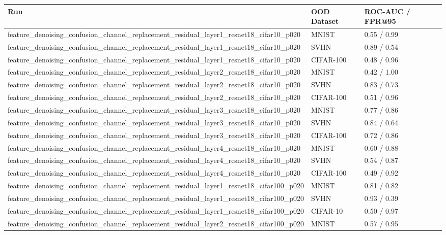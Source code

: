 \begin{tabular}{lll}
\toprule
Run & OOD Dataset & ROC-AUC / FPR@95 \\
\midrule
feature\_denoising\_confusion\_channel\_replacement\_residual\_layer1\_resnet18\_cifar10\_p020 & MNIST & 0.55 / 0.99 \\
feature\_denoising\_confusion\_channel\_replacement\_residual\_layer1\_resnet18\_cifar10\_p020 & SVHN & 0.89 / 0.54 \\
feature\_denoising\_confusion\_channel\_replacement\_residual\_layer1\_resnet18\_cifar10\_p020 & CIFAR-100 & 0.48 / 0.96 \\
feature\_denoising\_confusion\_channel\_replacement\_residual\_layer2\_resnet18\_cifar10\_p020 & MNIST & 0.42 / 1.00 \\
feature\_denoising\_confusion\_channel\_replacement\_residual\_layer2\_resnet18\_cifar10\_p020 & SVHN & 0.83 / 0.73 \\
feature\_denoising\_confusion\_channel\_replacement\_residual\_layer2\_resnet18\_cifar10\_p020 & CIFAR-100 & 0.51 / 0.96 \\
feature\_denoising\_confusion\_channel\_replacement\_residual\_layer3\_resnet18\_cifar10\_p020 & MNIST & 0.77 / 0.86 \\
feature\_denoising\_confusion\_channel\_replacement\_residual\_layer3\_resnet18\_cifar10\_p020 & SVHN & 0.84 / 0.64 \\
feature\_denoising\_confusion\_channel\_replacement\_residual\_layer3\_resnet18\_cifar10\_p020 & CIFAR-100 & 0.72 / 0.86 \\
feature\_denoising\_confusion\_channel\_replacement\_residual\_layer4\_resnet18\_cifar10\_p020 & MNIST & 0.60 / 0.88 \\
feature\_denoising\_confusion\_channel\_replacement\_residual\_layer4\_resnet18\_cifar10\_p020 & SVHN & 0.54 / 0.87 \\
feature\_denoising\_confusion\_channel\_replacement\_residual\_layer4\_resnet18\_cifar10\_p020 & CIFAR-100 & 0.49 / 0.92 \\
feature\_denoising\_confusion\_channel\_replacement\_residual\_layer1\_resnet18\_cifar100\_p020 & MNIST & 0.81 / 0.82 \\
feature\_denoising\_confusion\_channel\_replacement\_residual\_layer1\_resnet18\_cifar100\_p020 & SVHN & 0.93 / 0.39 \\
feature\_denoising\_confusion\_channel\_replacement\_residual\_layer1\_resnet18\_cifar100\_p020 & CIFAR-10 & 0.50 / 0.97 \\
feature\_denoising\_confusion\_channel\_replacement\_residual\_layer2\_resnet18\_cifar100\_p020 & MNIST & 0.57 / 0.95 \\

\end{tabular}
